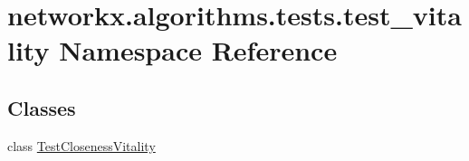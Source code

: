 \hypertarget{namespacenetworkx_1_1algorithms_1_1tests_1_1test__vitality}{}\section{networkx.\+algorithms.\+tests.\+test\+\_\+vitality Namespace Reference}
\label{namespacenetworkx_1_1algorithms_1_1tests_1_1test__vitality}
\subsection*{Classes}
\begin{DoxyCompactItemize}
\item 
class \hyperlink{classnetworkx_1_1algorithms_1_1tests_1_1test__vitality_1_1TestClosenessVitality}{Test\+Closeness\+Vitality}
\end{DoxyCompactItemize}
